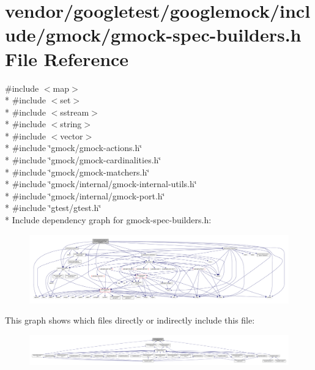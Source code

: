 \hypertarget{gmock-spec-builders_8h}{}\section{vendor/googletest/googlemock/include/gmock/gmock-\/spec-\/builders.h File Reference}
\label{gmock-spec-builders_8h}
{\ttfamily \#include $<$map$>$}\\*
{\ttfamily \#include $<$set$>$}\\*
{\ttfamily \#include $<$sstream$>$}\\*
{\ttfamily \#include $<$string$>$}\\*
{\ttfamily \#include $<$vector$>$}\\*
{\ttfamily \#include \char`\"{}gmock/gmock-\/actions.\+h\char`\"{}}\\*
{\ttfamily \#include \char`\"{}gmock/gmock-\/cardinalities.\+h\char`\"{}}\\*
{\ttfamily \#include \char`\"{}gmock/gmock-\/matchers.\+h\char`\"{}}\\*
{\ttfamily \#include \char`\"{}gmock/internal/gmock-\/internal-\/utils.\+h\char`\"{}}\\*
{\ttfamily \#include \char`\"{}gmock/internal/gmock-\/port.\+h\char`\"{}}\\*
{\ttfamily \#include \char`\"{}gtest/gtest.\+h\char`\"{}}\\*
Include dependency graph for gmock-\/spec-\/builders.h\+:
\nopagebreak
\begin{figure}[H]
\begin{center}
\leavevmode
\includegraphics[width=350pt]{gmock-spec-builders_8h__incl}
\end{center}
\end{figure}
This graph shows which files directly or indirectly include this file\+:
\nopagebreak
\begin{figure}[H]
\begin{center}
\leavevmode
\includegraphics[width=350pt]{gmock-spec-builders_8h__dep__incl}
\end{center}
\end{figure}
